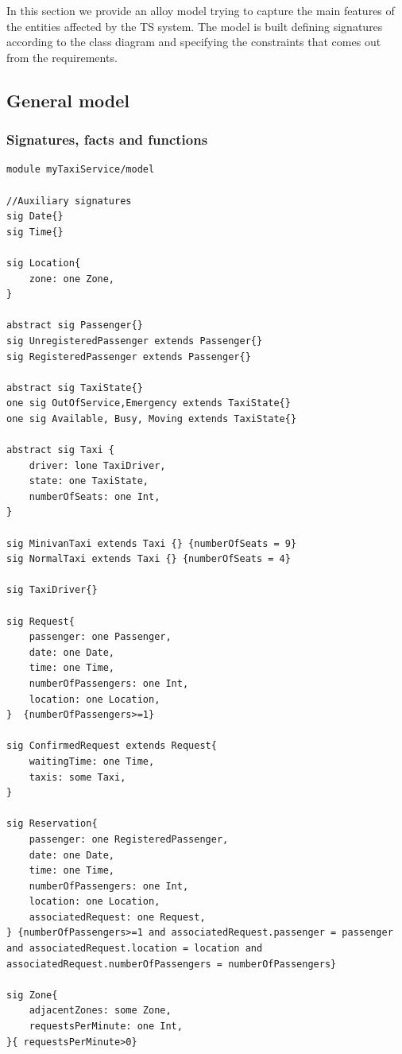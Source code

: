 In this section we provide an alloy model trying to capture the main
features of the entities affected by the TS system. The model is built
defining signatures according to the class diagram and specifying
the constraints that comes out from the requirements.


\subsection{General model}


\subsubsection{Signatures, facts and functions}

\begin{lstlisting}[breaklines=true]
module myTaxiService/model

//Auxiliary signatures 
sig Date{} 
sig Time{}

sig Location{ 	
	zone: one Zone, 
}

abstract sig Passenger{} 
sig UnregisteredPassenger extends Passenger{} 
sig RegisteredPassenger extends Passenger{}

abstract sig TaxiState{} 
one sig OutOfService,Emergency extends TaxiState{} 
one sig Available, Busy, Moving extends TaxiState{}

abstract sig Taxi { 	
	driver: lone TaxiDriver, 	
	state: one TaxiState, 	
	numberOfSeats: one Int, 
}  

sig MinivanTaxi extends Taxi {} {numberOfSeats = 9} 
sig NormalTaxi extends Taxi {} {numberOfSeats = 4}

sig TaxiDriver{}

sig Request{ 	
	passenger: one Passenger, 	
	date: one Date, 	
	time: one Time, 	
	numberOfPassengers: one Int, 	
	location: one Location, 
}  {numberOfPassengers>=1}

sig ConfirmedRequest extends Request{ 	
	waitingTime: one Time, 	
	taxis: some Taxi, 
}

sig Reservation{ 	
	passenger: one RegisteredPassenger, 	
	date: one Date, 	
	time: one Time, 	
	numberOfPassengers: one Int, 	
	location: one Location, 	
	associatedRequest: one Request, 
} {numberOfPassengers>=1 and associatedRequest.passenger = passenger and associatedRequest.location = location and associatedRequest.numberOfPassengers = numberOfPassengers}

sig Zone{ 	
	adjacentZones: some Zone, 	
	requestsPerMinute: one Int, 
}{ requestsPerMinute>0}


\end{lstlisting}

